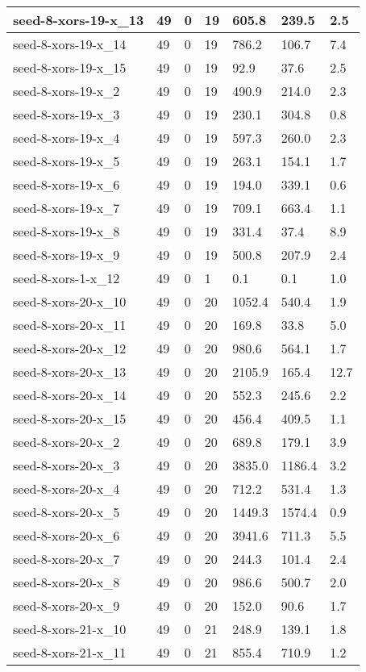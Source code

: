 \begin{scriptsize}
\begin{longtable}{|p{5cm}|l|l|l|l|l|l|}
seed-8-xors-19-x\_13&49&0&19&605.8&239.5&2.5 \\ \hline 
seed-8-xors-19-x\_14&49&0&19&786.2&106.7&7.4 \\ \hline 
seed-8-xors-19-x\_15&49&0&19&92.9&37.6&2.5 \\ \hline 
seed-8-xors-19-x\_2&49&0&19&490.9&214.0&2.3 \\ \hline 
seed-8-xors-19-x\_3&49&0&19&230.1&304.8&0.8 \\ \hline 
seed-8-xors-19-x\_4&49&0&19&597.3&260.0&2.3 \\ \hline 
seed-8-xors-19-x\_5&49&0&19&263.1&154.1&1.7 \\ \hline 
seed-8-xors-19-x\_6&49&0&19&194.0&339.1&0.6 \\ \hline 
seed-8-xors-19-x\_7&49&0&19&709.1&663.4&1.1 \\ \hline 
seed-8-xors-19-x\_8&49&0&19&331.4&37.4&8.9 \\ \hline 
seed-8-xors-19-x\_9&49&0&19&500.8&207.9&2.4 \\ \hline 
seed-8-xors-1-x\_12&49&0&1&0.1&0.1&1.0 \\ \hline 
seed-8-xors-20-x\_10&49&0&20&1052.4&540.4&1.9 \\ \hline 
seed-8-xors-20-x\_11&49&0&20&169.8&33.8&5.0 \\ \hline 
seed-8-xors-20-x\_12&49&0&20&980.6&564.1&1.7 \\ \hline 
seed-8-xors-20-x\_13&49&0&20&2105.9&165.4&12.7 \\ \hline 
seed-8-xors-20-x\_14&49&0&20&552.3&245.6&2.2 \\ \hline 
seed-8-xors-20-x\_15&49&0&20&456.4&409.5&1.1 \\ \hline 
seed-8-xors-20-x\_2&49&0&20&689.8&179.1&3.9 \\ \hline 
seed-8-xors-20-x\_3&49&0&20&3835.0&1186.4&3.2 \\ \hline 
seed-8-xors-20-x\_4&49&0&20&712.2&531.4&1.3 \\ \hline 
seed-8-xors-20-x\_5&49&0&20&1449.3&1574.4&0.9 \\ \hline 
seed-8-xors-20-x\_6&49&0&20&3941.6&711.3&5.5 \\ \hline 
seed-8-xors-20-x\_7&49&0&20&244.3&101.4&2.4 \\ \hline 
seed-8-xors-20-x\_8&49&0&20&986.6&500.7&2.0 \\ \hline 
seed-8-xors-20-x\_9&49&0&20&152.0&90.6&1.7 \\ \hline 
seed-8-xors-21-x\_10&49&0&21&248.9&139.1&1.8 \\ \hline 
seed-8-xors-21-x\_11&49&0&21&855.4&710.9&1.2 \\ \hline 

\end{longtable}
\end{scriptsize}
